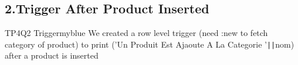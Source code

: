 \subsection*{2.Trigger After Product Inserted}


\begin{prettyBox}{TP4Q2 Trigger}{myblue}
    We created a row level trigger (need :new to fetch category of product) to print ('Un Produit Est Ajaoute A La Categorie '\texttt{||}nom) after a product is inserted 
\end{prettyBox}
